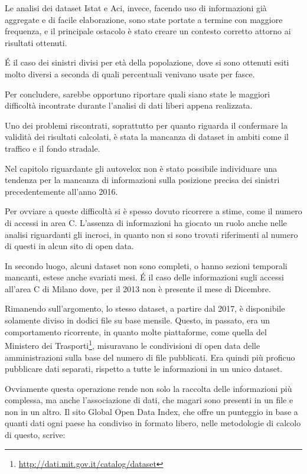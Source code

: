 \documentclass[a4paper,12pt]{report}
\newcommand{\skipline}{\vspace{0.2in}}
\begin{document}
Le analisi dei dataset Istat e Aci, invece, facendo uso di informazioni già aggregate 
e di facile elaborazione, sono state portate a termine con maggiore frequenza, e il 
principale ostacolo è stato creare un contesto corretto attorno ai risultati ottenuti. 

\'E il caso dei sinistri divisi per età della popolazione, dove si sono ottenuti esiti 
molto diversi a seconda di quali percentuali venivano usate per fasce.

\skipline
Per concludere, sarebbe opportuno riportare quali siano state le maggiori difficoltà 
incontrate durante l'analisi di dati liberi appena realizzata.

Uno dei problemi riscontrati, soprattutto per quanto riguarda il confermare la 
validità dei risultati calcolati, è stata la mancanza di dataset in ambiti come 
il traffico e il fondo stradale. 

Nel capitolo riguardante gli autovelox non è stato possibile individuare una tendenza 
per la mancanza di informazioni 
sulla posizione precisa dei sinistri precedentemente all'anno 2016. 

Per ovviare a queste difficoltà si è spesso dovuto ricorrere a stime, 
come il numero di accessi in area C. 
L'assenza di informazioni ha giocato un ruolo anche nelle analisi riguardanti gli incroci, 
in quanto non si sono trovati riferimenti al numero di questi in alcun sito di open data.


In secondo luogo, alcuni dataset non sono completi, o hanno sezioni temporali mancanti,
estese anche svariati mesi. 
\'E il caso delle informazioni sugli accessi all'area C di Milano dove, 
per il 2013 non è presente il mese di Dicembre.

Rimanendo sull'argomento, lo stesso dataset, a partire dal 2017, è disponibile 
solamente diviso in dodici file su base mensile.
Questo, in passato, era un comportamento ricorrente, in 
quanto molte piattaforme, come quella del Ministero dei 
Trasporti\footnote{\url{http://dati.mit.gov.it/catalog/dataset}}, 
misuravano le condivisioni di open data delle amministrazioni 
sulla base del numero di file pubblicati.
Era quindi più proficuo pubblicare dati separati, rispetto a tutte le informazioni in 
un unico dataset.

Ovviamente questa operazione rende non solo la raccolta delle informazioni più complessa, 
ma anche l'associazione di dati, che magari sono presenti in un file e non in un altro. 
Il sito Global Open Data Index, che offre un punteggio in base a quanti dati ogni paese 
ha condiviso in formato libero, nelle metodologie di calcolo di questo, scrive: 
\end{document}
